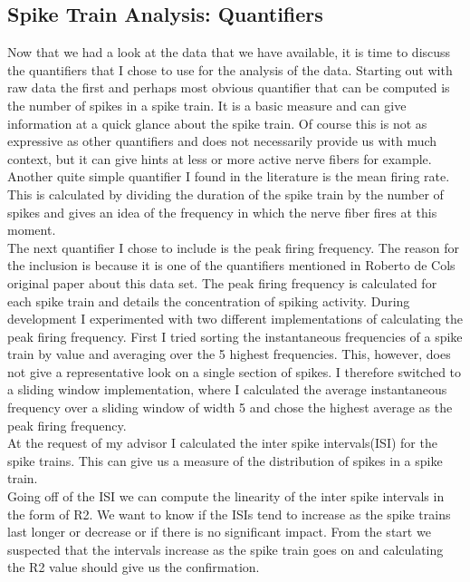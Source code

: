 \subsection{Spike Train Analysis: Quantifiers}
Now that we had a look at the data that we have available, it is time to discuss the quantifiers that I chose to use for the analysis of the data.
Starting out with raw data the first and perhaps most obvious quantifier that can be computed is the number of spikes in a spike train. It is a basic measure and can give information at a quick glance about the spike train. Of course this is not as expressive as other quantifiers and does not necessarily provide us with much context, but it can give hints at less or more active nerve fibers for example. \\
Another quite simple quantifier I found in the literature is the mean firing rate. This is calculated by dividing the duration of the spike train by the number of spikes and gives an idea of the frequency in which the nerve fiber fires at this moment.\\
The next quantifier I chose to include is the peak firing frequency. The reason for the inclusion is because it is one of the quantifiers mentioned in Roberto de Cols original paper about this data set. The peak firing frequency is calculated for each spike train and details the concentration of spiking activity. During development I experimented with two different implementations of calculating the peak firing frequency. First I tried sorting the instantaneous frequencies of a spike train by value and averaging over the 5 highest frequencies. This, however, does not give a representative look on a single section of spikes. I therefore switched to a sliding window implementation, where I calculated the average instantaneous frequency over a sliding window of width 5 and chose the highest average as the peak firing frequency.\\
At the request of my advisor I calculated the inter spike intervals(ISI) for the spike trains. This can give us a measure of the distribution of spikes in a spike train.\\
Going off of the ISI we can compute the linearity of the inter spike intervals in the form of R2. We want to know if the ISIs tend to increase as the spike trains last longer or decrease or if there is no significant impact. From the start we suspected that the intervals increase as the spike train goes on and calculating the R2 value should give us the confirmation.



\cleardoublepage
